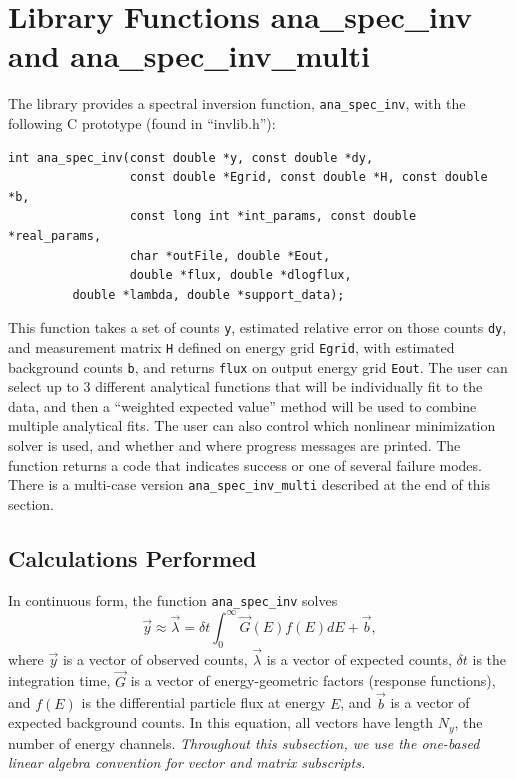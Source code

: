 \documentclass{article}    %
\begin{document}
\section{Library Functions ana\_spec\_inv and ana\_spec\_inv\_multi}

The library provides a spectral inversion function,
\verb|ana_spec_inv|, with the following C prototype (found in
``invlib.h''):
\begin{verbatim}
int ana_spec_inv(const double *y, const double *dy, 
                 const double *Egrid, const double *H, const double *b,
                 const long int *int_params, const double *real_params,
                 char *outFile, double *Eout, 
                 double *flux, double *dlogflux, 
		 double *lambda, double *support_data);
\end{verbatim}
                  
This function takes a set of counts \verb|y|, estimated relative error
on those counts \verb|dy|, and measurement matrix \verb|H| defined on
energy grid \verb|Egrid|, with estimated background counts \verb|b|,
and returns \verb|flux| on output energy grid \verb|Eout|. The user
can select up to 3 different analytical functions that will be
individually fit to the data, and then a ``weighted expected value''
method will be used to combine multiple analytical fits. The user can
also control which nonlinear minimization solver is used, and whether
and where progress messages are printed. The function returns a code
that indicates success or one of several failure modes. There is a
multi-case version \verb|ana_spec_inv_multi| described at the end of
this section.

\subsection{Calculations Performed}

In continuous form, the function \verb|ana_spec_inv| solves
\begin{equation}
\vec{y} \approx \vec{\lambda} = \delta t\int_0^{\infty} \vec{G}(E)f(E)dE + \vec{b}, \label{eqInt1}
\end{equation}
where $\vec{y}$ is a vector of observed counts, $\vec{\lambda}$ is a
vector of expected counts, $\delta t$ is the integration time, $\vec{G}$ is a
vector of energy-geometric factors (response functions), and $f(E)$ is
the differential particle flux at energy $E$, and $\vec{b}$ is a
vector of expected background counts. In this equation, all vectors
have length $N_y$, the number of energy channels. {\it Throughout this
  subsection, we use the one-based linear algebra convention for
  vector and matrix subscripts.}
\end{document}
